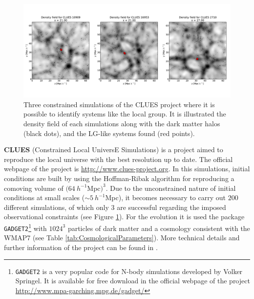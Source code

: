 \begin{figure}[htbp]
	\centering
	\includegraphics[width=1.0\textwidth]
	{./figures/3_nbody_simulations/CLUES_Simulations.pdf}

	\caption{\small{Three constrained simulations of the CLUES project 
	where it is possible to identify systems like the local group. It is
	illustrated the density field of each simulations along with the dark
	matter halos (black dots), and the LG-like systems found (red 
	points).}}
	
	\label{fig:CLUES_Right}
\end{figure}


\textbf{CLUES} (Constrained Local UniversE Simulations) is a project aimed
to reproduce the local universe with the best resolution up to date. The 
official webpage of the project is \url{http://www.clues-project.org}. In 
this simulations, initial conditions are built by using the Hoffman-Ribak
algorithm \cite{Hoffman1991} for reproducing a comoving volume of $(64\ 
h^{-1}$Mpc$)^{3}$. Due to the unconstrained nature of initial conditions at
small scales ($\sim 5\ h^{-1}$Mpc), it becomes necessary to carry out $200$
different simulations, of which only $3$ are successful regarding the 
imposed observational constraints (see Figure \ref{fig:CLUES_Right}).
For the evolution it is used the package \texttt{GADGET2}\footnote{
\texttt{GADGET2} is a very popular code for N-body simulations developed
by Volker Springel. It is available for free download in the official 
webpage of the project \url{http://www.mpa-garching.mpg.de/gadget/}}
with $1024^3$ particles of dark matter and a cosmology consistent with
the WMAP7 (see Table \ref{tab:CosmologicalParameters}). More technical 
details  and further information of the project can be found in
\cite{Gottloeber2010}.


